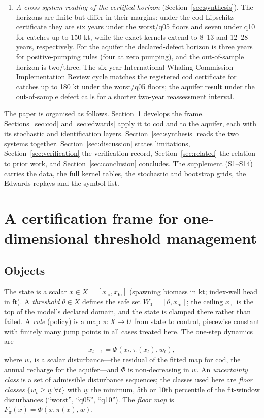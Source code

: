 \documentclass[11pt,a4paper]{article}
\theoremstyle{plain}
\theoremstyle{definition}
\theoremstyle{remark}
\newcommand{\safe}{W_0}
\newcommand{\LRP}{\theta}
\begin{document}
\begin{enumerate}[leftmargin=2em]
\item \emph{A cross-system reading of the certified horizon} (Section~\ref{sec:synthesis}). The horizons are finite but differ in their margins: under the cod Lipschitz certificate they are six years under the worst/q05 floors and seven under q10 for catches up to 150 kt, while the exact kernels extend to 8--13 and 12--28 years, respectively. For the aquifer the declared-defect horizon is three years for positive-pumping rules (four at zero pumping), and the out-of-sample horizon is two/three. The six-year International Whaling Commission Implementation Review cycle matches the registered cod certificate for catches up to 180 kt under the worst/q05 floors; the aquifer result under the out-of-sample defect calls for a shorter two-year reassessment interval.
\end{enumerate}

The paper is organised as follows. Section~\ref{sec:frame} develops the frame. Sections~\ref{sec:cod} and \ref{sec:edwards} apply it to cod and to the aquifer, each with its stochastic and identification layers. Section~\ref{sec:synthesis} reads the two systems together. Section~\ref{sec:discussion} states limitations, Section~\ref{sec:verification} the verification record, Section~\ref{sec:related} the relation to prior work, and Section~\ref{sec:conclusion} concludes. The supplement (S1--S14) carries the data, the full kernel tables, the stochastic and bootstrap grids, the Edwards replays and the symbol list.

\section{A certification frame for one-dimensional threshold management}\label{sec:frame}

\subsection{Objects}\label{sec:objects}

The state is a scalar $x\in X=[x_{\mathrm{lo}},x_{\mathrm{hi}}]$ (spawning biomass in kt; index-well head in ft). A \emph{threshold} $\LRP\in X$ defines the safe set $\safe=[\LRP,x_{\mathrm{hi}}]$; the ceiling $x_{\mathrm{hi}}$ is the top of the model's declared domain, and the state is clamped there rather than failed. A \emph{rule} (policy) is a map $\pi:X\to U$ from state to control, piecewise constant with finitely many jump points in all cases treated here. The one-step dynamics are
\begin{equation}\label{eq:dyn}
x_{t+1}=\Phi(x_t,\pi(x_t),w_t),
\end{equation}
where $w_t$ is a scalar disturbance---the residual of the fitted map for cod, the annual recharge for the aquifer---and $\Phi$ is non-decreasing in $w$. An \emph{uncertainty class} is a set of admissible disturbance sequences; the classes used here are \emph{floor classes} $\{w_t\ge \underline w\ \forall t\}$ with $\underline w$ the minimum, 5th or 10th percentile of the fit-window disturbances (``worst'', ``q05'', ``q10''). The \emph{floor map} is $F_\pi(x)=\Phi(x,\pi(x),\underline w)$.
\end{document}
